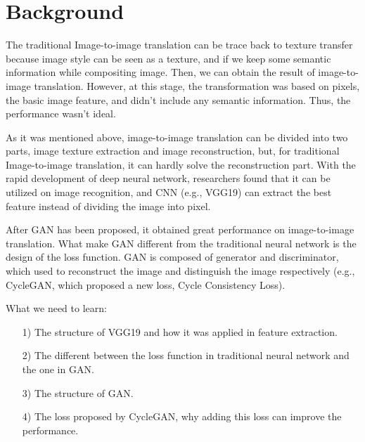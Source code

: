 \section{Background}
The traditional Image-to-image translation can be trace back to texture transfer because image style can be seen as a texture, and if we keep some semantic information while compositing image. Then, we can obtain the result of image-to-image translation. However, at this stage, the transformation was based on pixels, the basic image feature, and didn’t include any semantic information. Thus, the performance wasn’t ideal. 

As it was mentioned above, image-to-image translation can be divided into two parts, image texture extraction and image reconstruction, but, for traditional Image-to-image translation, it can hardly solve the reconstruction part. With the rapid development of deep neural network, researchers found that it can be utilized on image recognition, and CNN (e.g., VGG19) can extract the best feature instead of dividing the image into pixel. 

After GAN has been proposed, it obtained great performance on image-to-image translation. What make GAN different from the traditional neural network is the design of the loss function. GAN is composed of generator and discriminator, which used to reconstruct the image and distinguish the image respectively (e.g., CycleGAN, which proposed a new loss, Cycle Consistency Loss). 

What we need to learn:
\begin{itemize}
  \item [1)] 
The structure of VGG19 and how it was applied in feature extraction.
  \item [2)] 
The different between the loss function in traditional neural network and the one in GAN.
  \item [3)] 
The structure of GAN. 
  \item [4)] 
The loss proposed by CycleGAN, why adding this loss can improve the performance.
\end{itemize}



